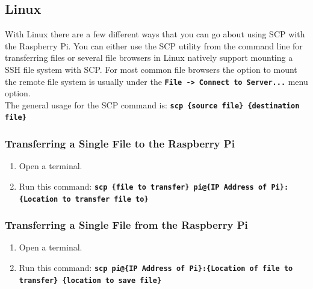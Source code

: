 \documentclass{article}
\def\code#1{\textbf{\texttt{#1}}}
\begin{document}
	\subsection{Linux}

	With Linux there are a few different ways that you can go about using SCP with the Raspberry Pi. You can either use the SCP utility from the command line for transferring files or several file browsers in Linux natively support mounting a SSH file system with SCP. For most common file browsers the option to mount the remote file system is usually under the \code{File -> Connect to Server...} menu option. \\
	
	The general usage for the SCP command is: \code{scp \{source file\} \{destination file\}}
	
	\subsubsection{Transferring a Single File to the Raspberry Pi}
	
	\begin{enumerate}[1.)]
		\item Open a terminal.
		
		\item Run this command: \code{scp \{file to transfer\} pi@\{IP Address of Pi\}:\{Location to transfer file to\}}
	\end{enumerate}
	
	\subsubsection{Transferring a Single File from the Raspberry Pi}
	
	\begin{enumerate}[1.)]
		\item Open a terminal.
		
		\item Run this command: \code{scp pi@\{IP Address of Pi\}:\{Location of file to transfer\} \{location to save file\}} 
	\end{enumerate}





	
	







\end{document}
